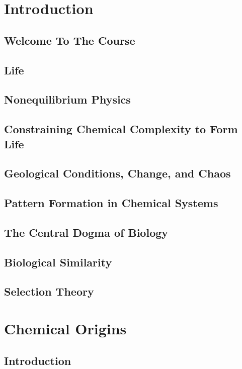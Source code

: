 \documentclass[]{article}
\begin{document}
\tableofcontents
\listoffigures

\section{Introduction}
\subsection{Welcome To The Course}
\subsection{Life}
\cite{bell2015potentially}
\subsection{Nonequilibrium Physics}
\subsection{Constraining Chemical Complexity to Form Life}
\subsection{Geological Conditions, Change, and Chaos}
\subsection{Pattern Formation in Chemical Systems}
\subsection{The Central Dogma of Biology}
\cite{crick1958biological} \cite{crick1970central}
\subsection{Biological Similarity}
\subsection{Selection Theory}
\cite{eigen1978hypercycle} \cite{eigen1988molecular} \cite{eigen2002error} \cite{crotty2001rna} \cite{stadtler2002fitness_landscapes}
\section{Chemical Origins}
\subsection{Introduction}
\end{document}
